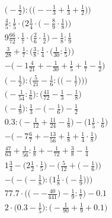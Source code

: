 \documentclass[8pt]{article}
\begin{document}
\begin{align}
\Big(-\frac{1}{2}\Big) : \Big(\big(--\frac{1}{3} + \frac{1}{3} + \frac{1}{2}\big)\Big) \\
\frac{4}{5} : \frac{1}{5} \cdot \Big(2\frac{1}{4} \cdot \big(-\frac{8}{9} \cdot \frac{1}{8}\big)\Big) \\
9\frac{66}{72} \cdot \frac{1}{7} \cdot \big(\frac{2}{6} \cdot \frac{1}{2}\big) - \frac{1}{8} : \frac{1}{9} \\
\frac{3}{28} + \frac{1}{7} : \Big(\frac{3}{8} : \frac{1}{4} \cdot \big(\frac{1}{30} : \frac{1}{5}\big)\Big) \\
-\big(-1\frac{4}{21} + -\frac{1}{30} + \frac{1}{5} + \frac{1}{7} - \frac{1}{2}\big) \\
\bigg(-\frac{1}{2}\bigg) : \bigg(\frac{5}{21} - \frac{1}{6} : \Big(\big(-\frac{1}{7}\big)\Big)\bigg) \\
\big(-\frac{1}{54} : \frac{1}{6}\big) : \big(\frac{41}{72} - \frac{1}{3} - \frac{1}{8}\big) \\
\big(-\frac{4}{9}\big) : \frac{1}{3} - \big(-\frac{1}{6}\big) - \frac{1}{2} \\
0.3 : \big(-\frac{1}{12} + \frac{11}{24} - \frac{1}{8}\big) - \big(1\frac{1}{5} \cdot \frac{1}{6}\big) \\
-\big(-7\frac{6}{7} + -\frac{13}{56} + \frac{1}{8} + \frac{1}{4} \cdot \frac{1}{8}\big) \\
\frac{47}{63} + \frac{1}{56} : \frac{1}{8} + -\frac{1}{72} + \frac{3}{8} - \frac{1}{4} \\
1\frac{3}{4} - \Big(2\frac{1}{2} \cdot \frac{1}{5}\Big) - \Big(\frac{5}{12} + \big(-\frac{1}{6}\big)\Big) \\
-\bigg(-\Big(-\frac{1}{8}\Big) : \Big(1\frac{1}{8} \cdot \big(-\frac{1}{9}\big)\Big)\bigg) \\
77.7 \cdot \Big(\big(--\frac{40}{441}\big) - \frac{1}{9} : \frac{1}{7}\Big) - 0.1 \\
2 \cdot \big(0.3 - \frac{1}{5}\big) : \big(-\frac{1}{90} + \frac{1}{9} + 0.1\big)
\end{align}
\end{document}
